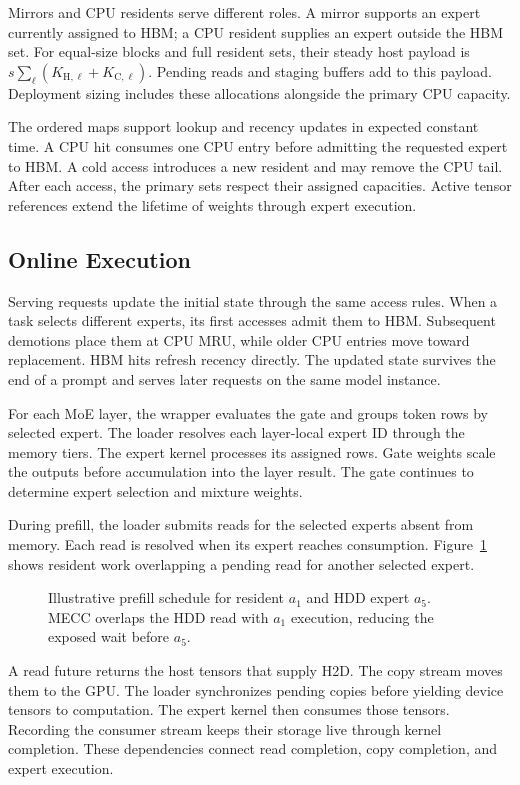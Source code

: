 Mirrors and CPU residents serve different roles.
A mirror supports an expert currently assigned to HBM; a CPU resident supplies an expert outside the HBM set.
For equal-size blocks and full resident sets, their steady host payload is $s\sum_\ell(K_{\mathrm H,\ell}+K_{\mathrm C,\ell})$.
Pending reads and staging buffers add to this payload.
Deployment sizing includes these allocations alongside the primary CPU capacity.

The ordered maps support lookup and recency updates in expected constant time.
A CPU hit consumes one CPU entry before admitting the requested expert to HBM.
A cold access introduces a new resident and may remove the CPU tail.
After each access, the primary sets respect their assigned capacities.
Active tensor references extend the lifetime of weights through expert execution.

\subsection{Online Execution}
\label{sec:weight_delivery}
Serving requests update the initial state through the same access rules.
When a task selects different experts, its first accesses admit them to HBM.
Subsequent demotions place them at CPU MRU, while older CPU entries move toward replacement.
HBM hits refresh recency directly.
The updated state survives the end of a prompt and serves later requests on the same model instance.

For each MoE layer, the wrapper evaluates the gate and groups token rows by selected expert.
The loader resolves each layer-local expert ID through the memory tiers.
The expert kernel processes its assigned rows.
Gate weights scale the outputs before accumulation into the layer result.
The gate continues to determine expert selection and mixture weights.

During prefill, the loader submits reads for the selected experts absent from memory.
Each read is resolved when its expert reaches consumption.
Figure~\ref{fig:delivery} shows resident work overlapping a pending read for another selected expert.

\begin{figure}[H]
\centering
\par\nointerlineskip
\caption{Illustrative prefill schedule for resident $a_1$ and HDD expert $a_5$.
MECC overlaps the HDD read with $a_1$ execution, reducing the exposed wait before $a_5$.}
\label{fig:delivery}
\end{figure}
A read future returns the host tensors that supply H2D.
The copy stream moves them to the GPU.
The loader synchronizes pending copies before yielding device tensors to computation.
The expert kernel then consumes those tensors.
Recording the consumer stream keeps their storage live through kernel completion.
These dependencies connect read completion, copy completion, and expert execution.

